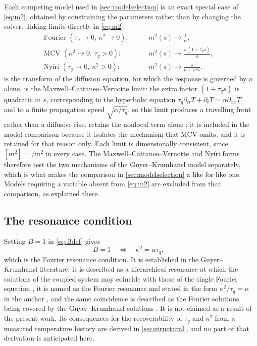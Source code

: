 \documentclass[preprint,12pt,a4paper]{elsarticle}
\theoremstyle{plain}
\theoremstyle{definition}
\theoremstyle{remark}
\newcommand{\tq}{\tau_{q}}
\newcommand{\kk}{\kappa^{2}}
\newcommand{\Bnum}{B}
\begin{document}
Each competing model used in \cref{sec:modelselection} is an exact special case
of \eqref{eq:m2}, obtained by constraining the parameters rather than by
changing the solver. Taking limits directly in \eqref{eq:m2}:
%
\begin{align}
  \text{Fourier } (\tq \to 0,\ \kk \to 0): &\qquad
    m^{2}(s) \to \frac{s}{\alpha} ,
  \label{eq:lim-fourier} \\[0.5ex]
  \text{MCV } (\kk \to 0,\ \tq > 0): &\qquad
    m^{2}(s) \to \frac{s\,(1 + \tq s)}{\alpha} ,
  \label{eq:lim-mcv} \\[0.5ex]
  \text{Nyíri } (\tq \to 0,\ \kk > 0): &\qquad
    m^{2}(s) \to \frac{s}{\alpha + \kk s} .
  \label{eq:lim-nyiri}
\end{align}
%
 is the transform of the diffusion equation, for which the
response is governed by $\alpha$ alone.  is the
Maxwell--Cattaneo--Vernotte limit: the extra factor $(1+\tq s)$ is quadratic in
$s$, corresponding to the hyperbolic equation $\tq \partial_{tt}T +
\partial_{t}T = \alpha \partial_{xx}T$ and to a finite propagation speed
$\sqrt{\alpha/\tq}$, so this limit produces a travelling front rather than a
diffusive rise.  retains the nonlocal term alone
\cite{Nyiri1991}; it is included in the model comparison because it isolates
the mechanism that MCV omits, and it is retained for that reason only. Each
limit is dimensionally consistent, since $[m^{2}] = \si{\per\metre\squared}$ in
every case. The Maxwell--Cattaneo--Vernotte and Nyíri forms therefore test the
two mechanisms of the Guyer--Krumhansl model separately, which is what makes
the comparison in \cref{sec:modelselection} a like for like one. Models
requiring a variable absent from \eqref{eq:m2} are excluded from that
comparison, as explained there.

\subsection{The resonance condition}
\label{sec:model-resonance}

Setting $\Bnum = 1$ in \eqref{eq:Bdef} gives
%
\begin{equation}
  \Bnum = 1
  \quad\Longleftrightarrow\quad
  \kk = \alpha \tq ,
  \label{eq:resonance-condition}
\end{equation}
%
which is the Fourier resonance condition. It is established in the
Guyer--Krumhansl literature: it is described as a hierarchical resonance at
which the solutions of the coupled system may coincide with those of the single
Fourier equation \cite{FulopKovacsVan2015}, it is named as the Fourier
resonance and stated in the form $\kk/\tq = \alpha$ in the anchor
\cite{Kovacs2018}, and the same coincidence is described as the Fourier
solutions being covered by the Guyer--Krumhansl solutions
\cite{Fulop2018entropy}. It is not claimed as a result of the present work.
Its consequences for the recoverability of $\tq$ and $\kk$ from a measured
temperature history are derived in \cref{sec:structural}, and no part of that
derivation is anticipated here.
\end{document}
